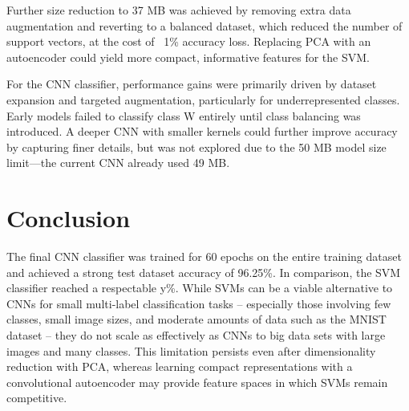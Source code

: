 \documentclass[a4, 10 pt, conference]{ieeeconf}  %
\begin{document}
Further size reduction to 37 MB was achieved by removing extra data augmentation and reverting to a balanced dataset, which reduced the number of support vectors, at the cost of ~1\% accuracy loss. Replacing PCA with an autoencoder could yield more compact, informative features for the SVM.

For the CNN classifier, performance gains were primarily driven by dataset expansion and targeted augmentation, particularly for underrepresented classes. Early models failed to classify class W entirely until class balancing was introduced. A deeper CNN with smaller kernels could further improve accuracy by capturing finer details, but was not explored due to the 50 MB model size limit—the current CNN already used 49 MB.


\section{Conclusion}
\label{sec:con}

The final CNN classifier was trained for 60 epochs on the entire training
dataset and achieved a strong test dataset accuracy of 96.25\%. In comparison,
the SVM classifier reached a respectable y\%. While SVMs can be a viable
alternative to CNNs for small multi-label classification tasks -- especially
those involving few classes, small image sizes, and moderate amounts of
data such as the MNIST dataset -- they do not scale as effectively as CNNs
to big data sets with large images and many classes. This limitation persists even after
dimensionality reduction with PCA, whereas learning compact representations
with a convolutional autoencoder may provide feature spaces in which SVMs remain competitive.


\end{document}
